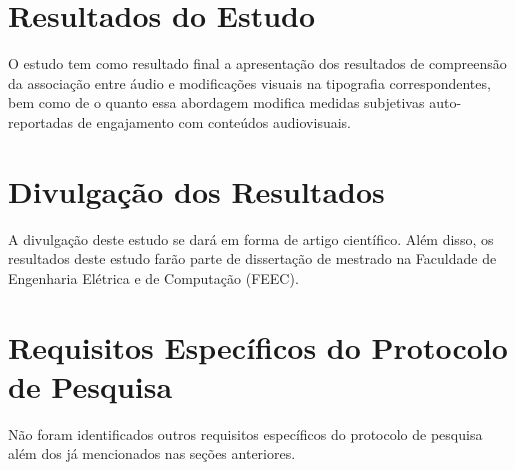 \documentclass[a4paper,11pt,titlepage,singlespacing]{article}
\begin{document}
\section{Resultados do Estudo}
\noindent O estudo tem como resultado final a apresentação dos resultados de compreensão da associação entre áudio e modificações visuais na tipografia correspondentes, bem como de o quanto essa abordagem modifica medidas subjetivas auto-reportadas de engajamento com conteúdos audiovisuais.

\section{Divulgação dos Resultados}
A divulgação deste estudo se dará em forma de artigo científico. Além disso, os resultados deste estudo farão parte de dissertação de mestrado na Faculdade de Engenharia Elétrica e de Computação (FEEC).

\section{Requisitos Específicos do Protocolo de Pesquisa}
Não foram identificados outros requisitos específicos do protocolo de pesquisa além dos já mencionados nas seções anteriores.






\newpage
{}

\end{document}
